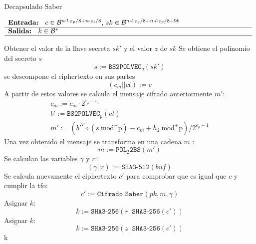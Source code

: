 \begin{algorithm}[H]
	\small
	\caption{Decapsulado Saber}
	$\begin{array}{p{\textwidth}}
		\textbf{Entrada: } \(c\in \mathcal{B}^{n\cdot l\cdot \varepsilon_p/8+n\cdot \varepsilon_t/8}\), \(sk\in \mathcal{B}^{n\cdot l \cdot \varepsilon_q/8+n\cdot l \cdot \varepsilon_p/8+96}\)\\ 
		\hline
		\textbf{Salida: } \(k\in \mathcal{B}^{*}\)\\ 
		\hline
	\end{array}$
	\begin{algorithmic}[1]
		\State Obtener el valor de la llave secreta \(sk'\) y el valor \(z\) de \(sk\) 
		\State Se obtiene el polinomio del secreto \(s\)
		\begin{equation}
			s:=\texttt{BS2POLVEC}_q(sk')
		\end{equation}
		\State se descompone el ciphertexto en sus partes
		\begin{equation}
			(c_m||ct):=c
		\end{equation}
		\State A partir de estos valores se calcula el mensaje cifrado anteriormente \(m'\):
		\begin{equation}
			\begin{array}{l}
				c_m:=c_m\cdot 2^{\varepsilon_p-\varepsilon_t}\\
				b':=\texttt{BS2POLVEC}_p(ct)\\
				m':=(b'^T \circ (s \ \text{mod}^{+}\text{p}) -c_m +h_2 \ \text{mod}^{+}\text{p})/2^{\varepsilon_p-1}
			\end{array}
		\end{equation}
		\State Una vez obtenido el mensaje se transforma en una cadena \(m\) :
		\begin{equation}
			m:=\texttt{POL}_2\texttt{2BS}(m')
		\end{equation}
		\State Se calculan las variables \(\gamma\) y \(r\):
		\begin{equation}
			(\gamma||r):=\texttt{SHA3-512}(buf)
		\end{equation}
		\State Se calcula nuevamente el ciphertexto \(c'\) para comprobar que es igual que \(c\) y cumplir la \gls{tfo}:
		\begin{equation}
			c':=\texttt{Cifrado Saber}(pk,m,\gamma)
		\end{equation}
		\State Asignar \(k\):
		\begin{equation}
			k:=\texttt{SHA3-256}(r||\texttt{SHA3-256}(c'))
		\end{equation}
		\Else
		\State Asignar \(k\):
		\begin{equation}
			k:=\texttt{SHA3-256}(z||\texttt{SHA3-256}(c'))
		\end{equation}
		\EndIf
		\State \Return k
	\end{algorithmic}
\end{algorithm}
\newpage
